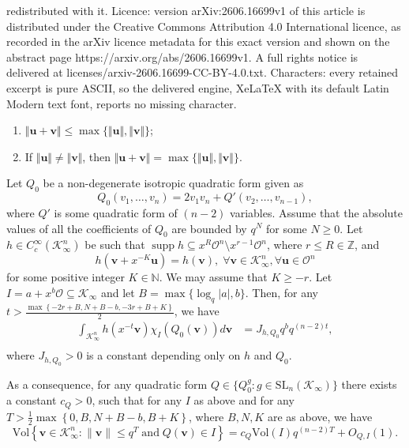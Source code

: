 \documentclass[10pt,a4paper]{amsart}
\DeclareMathOperator{\supp}{supp}
\def\vol{\mathrm{Vol}}
\newcommand{\SL}{\mathrm{SL}}
\begin{document}
redistributed with it. Licence: version arXiv:2606.16699v1 of this article is distributed under the Creative Commons Attribution 4.0 International licence, as recorded in the arXiv licence metadata for this exact version and shown on the abstract page https://arxiv.org/abs/2606.16699v1. A full rights notice is delivered at licenses/arxiv-2606.16699-CC-BY-4.0.txt. Characters: every retained excerpt is pure ASCII, so the delivered engine, XeLaTeX with its default Latin Modern text font, reports no missing character.
    \begin{enumerate}
        \item \label{lem:UM} $\Vert \mathbf{u}+\mathbf{v}\Vert\leq \max\{\Vert \mathbf{u}\Vert,\Vert\mathbf{v}\Vert\}$;
        \item \label{lem:UM=} If $\Vert \mathbf{u}\Vert\neq \Vert \mathbf{v}\Vert$, then $\Vert \mathbf{u}+\mathbf{v}\Vert=\max\{\Vert \mathbf{u}\Vert,\Vert \mathbf{v}\Vert\}$.
    \end{enumerate}

\begin{theorem}\label{volume estimate}
Let $Q_0$ be a non-degenerate isotropic quadratic form given as
\begin{equation}\label{standard quadratic form}
Q_0(v_1, \ldots, v_n)=2v_1v_n+Q'(v_2, \ldots, v_{n-1}),
\end{equation}
where $Q'$ is some quadratic form of $(n-2)$ variables. Assume that the absolute values of all the coefficients of $Q_0$ are bounded by $q^N$ for some $N\ge 0$.
Let $h\in C_c^{\infty}(\mathcal K_\infty^n)$ be such that $\supp h \subseteq x^{R}\mathcal O^n\setminus x^{r-1}\mathcal O^n$, where $r\le R\in \mathbb Z$, and
\begin{equation}\label{eqn: Sobolev}
h(\mathbf v + x^{-K}\mathbf{u})=h(\mathbf v), \;\forall \mathbf v\in \mathcal K_\infty^n,\forall \mathbf{u}\in \mathcal{O}^n
\end{equation}
for some positive integer $K\in \mathbb N$. We may assume that $K\ge -r$.
Let $I=a+x^b\mathcal O\subseteq \mathcal K_\infty$ and let $B=\max\{\log_q|a|, b\}$. Then, for any $t> \frac{\max\left\{-2r+B,N+B-b,-3r+B+K\right\}} 2$, we have
\begin{equation}\begin{split}
\label{eqn:smoothVolEst}
\int_{\mathcal K_\infty^n} h(x^{-t}\mathbf v) \chi^{}_{I}(Q_0(\mathbf v)) d\mathbf v
&=J_{h,Q_0}q^{b}q^{(n-2)t},\\
\end{split}\end{equation}
where $J_{h,Q_0}>0$ is a constant depending only on $h$ and $Q_0$.

As a consequence, for any quadratic form $Q\in \{Q_0^g: g\in \SL_n(\mathcal K_\infty)\}$ there exists a constant $c_Q>0$, such that for any $I$ as above and for any $T>\frac{1}{2}\max\left\{0,B,N+B-b,B+K\right\}$, where $B,N,K$ are as above, we have
\begin{equation}
\label{eqn:VolEst}
\vol\left\{\mathbf v \in \mathcal K_\infty^n: \|\mathbf v \|\leq q^T\;\text{and}\; Q(\mathbf v)\in I\right\}
=c_Q \vol(I)q^{(n-2)T}+O_{Q,I}\left(1\right).
\end{equation}
\end{theorem}
\end{document}
